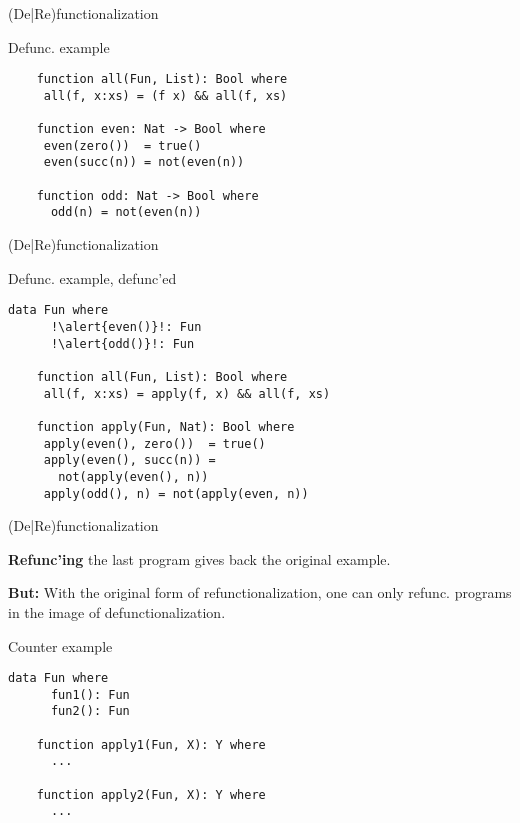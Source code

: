 \documentclass[xcolor=svgnames]{beamer}
\begin{document}
\begin{frame}[fragile]
  {(De|Re)functionalization}

  \begin{block}{Defunc. example}
    \begin{lstlisting}
    function all(Fun, List): Bool where
     all(f, x:xs) = (f x) && all(f, xs)

    function even: Nat -> Bool where
     even(zero())  = true()
     even(succ(n)) = not(even(n))

    function odd: Nat -> Bool where
      odd(n) = not(even(n))
    \end{lstlisting}
  \end{block}
\end{frame}

\begin{frame}[fragile]
  {(De|Re)functionalization}

  \begin{block}{Defunc. example, defunc'ed}
    \begin{lstlisting}[escapechar=!]
    data Fun where
      !\alert{even()}!: Fun
      !\alert{odd()}!: Fun

    function all(Fun, List): Bool where
     all(f, x:xs) = apply(f, x) && all(f, xs)

    function apply(Fun, Nat): Bool where
     apply(even(), zero())  = true()
     apply(even(), succ(n)) =
       not(apply(even(), n))
     apply(odd(), n) = not(apply(even, n))
    \end{lstlisting}
  \end{block}
\end{frame}

\begin{frame}[fragile]
  {(De|Re)functionalization}

  \textbf{Refunc'ing} the last program gives back the original example.

  \textbf{But:} With the original form of refunctionalization, one can only refunc. programs in the image of defunctionalization.

  \begin{block}{Counter example}
    \begin{lstlisting}[escapechar=!]
    data Fun where
      fun1(): Fun
      fun2(): Fun

    function apply1(Fun, X): Y where
      ...
    
    function apply2(Fun, X): Y where
      ...
    \end{lstlisting}
  \end{block}
\end{frame}
\end{document}
